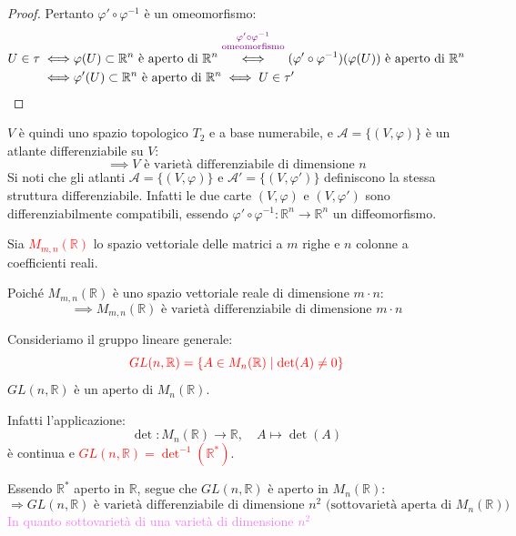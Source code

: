 \begin{esempio}
\begin{proof}
        Pertanto $\varphi' \circ \varphi^{-1}$ è un omeomorfismo:
        \[
        \begin{aligned}
        U \in \tau \iff &\varphi(U) \subset \mathbb{R}^n \text{ è aperto di } \mathbb{R}^n
        \overset{\textcolor{violet}{\substack{\varphi' \circ \varphi^{-1} \\ \text{omeomorfismo} \\ \text{}}}}{\iff} (\varphi' \circ \varphi^{-1})(\varphi(U)) \text{ è aperto di } \mathbb{R}^n \\
        \iff &\varphi'(U) \subset \mathbb{R}^n \text{ è aperto di } \mathbb{R}^n \iff U \in \tau'
        \end{aligned}
        \]
        \end{proof}
        $V$ è quindi uno spazio topologico $T_2$ e a base numerabile, e $\mathcal{A} = \{(V, \varphi)\}$ è un atlante differenziabile su $V$:
        \[
        \implies V \text{ è varietà differenziabile di dimensione } n
        \]
        Si noti che gli atlanti $\mathcal{A} = \{(V, \varphi)\}$ e $\mathcal{A}' = \{(V, \varphi')\}$ definiscono la stessa struttura differenziabile. Infatti le due carte $(V, \varphi)$ e $(V, \varphi')$ sono differenziabilmente compatibili, essendo $\varphi' \circ \varphi^{-1} \colon \mathbb{R}^n \to \mathbb{R}^n$ un diffeomorfismo.
        \end{esempio}

        \newpage

        \begin{esempio}
        \mbox{}

        Sia \textcolor{red}{$M_{m,n}(\mathbb{R})$} lo spazio vettoriale delle matrici a $m$ righe e $n$ colonne a coefficienti reali. 
        
        Poiché $M_{m,n}(\mathbb{R})$ è uno spazio vettoriale reale di dimensione $m \cdot n$:
        \[
        \implies M_{m,n}(\mathbb{R}) \text{ è varietà differenziabile di dimensione } m \cdot n
        \]
        \end{esempio}

        \begin{esempio}
        \mbox{}

        Consideriamo il gruppo lineare generale:
        \[
        \color{red}{GL(n, \mathbb{R}) = \{A \in M_n(\mathbb{R}) \mid \det(A) \neq 0\}}
        \]
        $GL(n, \mathbb{R})$ è un aperto di $M_n(\mathbb{R})$. 
        
        Infatti l'applicazione:
        \[
        \det \colon M_n(\mathbb{R}) \to \mathbb{R}, \quad A \longmapsto \det(A)
        \]
        è continua e \textcolor{red}{$GL(n, \mathbb{R}) = \det^{-1}(\mathbb{R}^*)$}. 
        
        Essendo $\mathbb{R}^*$ aperto in $\mathbb{R}$, segue che $GL(n, \mathbb{R})$ è aperto in $M_n(\mathbb{R})$:
        \[
        \Rightarrow GL(n, \mathbb{R}) \text{ è varietà differenziabile di dimensione } n^2 \text{ (sottovarietà aperta di } M_n(\mathbb{R})\text{)}
        \]
        \textcolor{violet}{In quanto sottovarietà di una varietà di dimensione $n^2$}
        \end{esempio}
